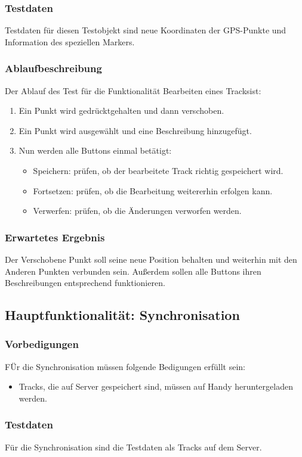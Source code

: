 \documentclass{article}
\begin{document}
\subsubsection{Testdaten}
	Testdaten für diesen Testobjekt sind neue Koordinaten der GPS-Punkte und Information des speziellen Markers.
\subsubsection{Ablaufbeschreibung}
	Der Ablauf des Test für die Funktionalität \glqq Bearbeiten eines Tracks\grqq ist:
	\begin{enumerate}
		\item Ein Punkt wird gedrücktgehalten und dann verschoben.
		\item Ein Punkt wird ausgewählt und eine Beschreibung hinzugefügt.
		\item Nun werden alle Buttons einmal betätigt:
			\begin{itemize}
				\item Speichern: prüfen, ob der bearbeitete Track richtig gespeichert wird.
				\item Fortsetzen: prüfen, ob die Bearbeitung weitererhin erfolgen kann.
				\item Verwerfen: prüfen, ob die Änderungen verworfen werden.
			\end{itemize}
	\end{enumerate}
\subsubsection{Erwartetes Ergebnis}
	Der Verschobene Punkt soll seine neue Position behalten und weiterhin mit den Anderen Punkten verbunden sein. Außerdem sollen alle Buttons ihren Beschreibungen entsprechend funktionieren.

\subsection{Hauptfunktionalität: Synchronisation}
\subsubsection{Vorbedigungen}
	FÜr die Synchronisation müssen folgende Bedigungen erfüllt sein:
	\begin{itemize}
		\item Tracks, die auf Server gespeichert sind, müssen auf Handy heruntergeladen werden.
	\end{itemize}
\subsubsection{Testdaten}
	Für die Synchronisation sind die Testdaten als Tracks auf dem Server.
\end{document}
